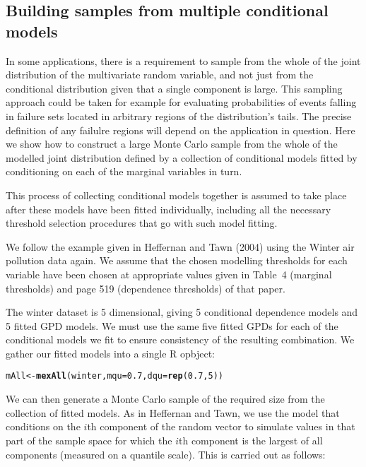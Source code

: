 \documentclass[10pt]{article}\usepackage[]{graphicx}\usepackage[]{color}
\makeatletter
\newcommand{\hlnum}[1]{\textcolor[rgb]{0.686,0.059,0.569}{#1}}%
\newcommand{\hlstd}[1]{\textcolor[rgb]{0.345,0.345,0.345}{#1}}%
\newcommand{\hlkwb}[1]{\textcolor[rgb]{0.69,0.353,0.396}{#1}}%
\newcommand{\hlkwc}[1]{\textcolor[rgb]{0.333,0.667,0.333}{#1}}%
\newcommand{\hlkwd}[1]{\textcolor[rgb]{0.737,0.353,0.396}{\textbf{#1}}}%
\newenvironment{kframe}{%
 \def\at@end@of@kframe{}%
 \ifinner\ifhmode%
  \def\at@end@of@kframe{\end{minipage}}%
  \begin{minipage}{\columnwidth}%
 \fi\fi%
 \def\FrameCommand##1{\hskip\@totalleftmargin \hskip-\fboxsep
 \colorbox{shadecolor}{##1}\hskip-\fboxsep
     \hskip-\linewidth \hskip-\@totalleftmargin \hskip\columnwidth}%
 \MakeFramed {\advance\hsize-\width
   \@totalleftmargin\z@ \linewidth\hsize
   \@setminipage}}%
 {\par\unskip\endMakeFramed%
 \at@end@of@kframe}
\newenvironment{knitrout}{}{} %
\makeatother
\begin{document}
\subsection{Building samples from multiple conditional models}
\label{sect:MultipleCondModels}

In some applications, there is a requirement to sample from the whole of the joint distribution of the multivariate random variable, and not just from the conditional distribution given that a single component is large.  This sampling approach could be taken for example for evaluating probabilities of events falling in failure sets located in arbitrary regions of the distribution's tails.  The precise definition of any failulre regions will depend on the application in question.  Here we show how to construct a large Monte Carlo sample from the whole of the modelled joint distribution defined by a collection of conditional models fitted by conditioning on each of the marginal variables in turn.

This process of collecting conditional models together is assumed to take place after these models have been fitted individually, including all the necessary threshold selection procedures that go with such model fitting.

We follow the example given in Heffernan and Tawn (2004) using the Winter air pollution data again.  We assume that the chosen modelling thresholds for each variable have been chosen at appropriate values given in Table~4 (marginal thresholds) and page 519 (dependence thresholds) of that paper.

The winter dataset is 5 dimensional, giving 5 conditional dependence models and 5 fitted GPD models.   We must use the same five fitted GPDs for each of the conditional models we fit to ensure consistency of the resulting combination. We gather our fitted models into a single R opbject:

\begin{knitrout}
\color{fgcolor}\begin{kframe}
\begin{alltt}
\hlstd{mAll} \hlkwb{<-} \hlkwd{mexAll}\hlstd{(winter,}\hlkwc{mqu}\hlstd{=}\hlnum{0.7}\hlstd{,}\hlkwc{dqu}\hlstd{=}\hlkwd{rep}\hlstd{(}\hlnum{0.7}\hlstd{,}\hlnum{5}\hlstd{))}
\end{alltt}
\end{kframe}
\end{knitrout}

We can then generate a Monte Carlo sample of the required size from the collection of fitted models.  As in Heffernan and Tawn, we use the model that conditions on the $i$th component of the random vector to simulate values in that part of the sample space for which the $i$th component is the largest of all components (measured on a quantile scale).  This is carried out as follows:
\end{document}
